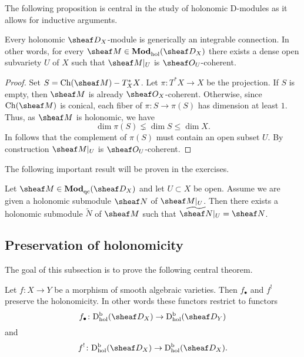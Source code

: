\documentclass[number-in-sections,a4paper]{notes}
\begin{document}
The following proposition is central in the study of holonomic D-modules as it allows for inductive arguments.

\begin{Proposition}\label{prop:generically-integrable-connection}
    Every holonomic $\sD_X$-module is generically an integrable connection.
    In other words, for every $\sheaf M \in \catDModhol{X}$ there exists a dense open subvariety $U$ of $X$ such that $\res{\sheaf M}{U}$ is $\sO_U$-coherent.
\end{Proposition}

\begin{proof}
    Set $S = \Ch(\sheaf M) \setminus T^*_XX$.
    Let $\pi \colon T^*X \to X$ be the projection.
    If $S$ is empty, then $\sheaf M$ is already $\sO_X$-coherent.
    Otherwise, since $\Ch(\sheaf M)$ is conical, each fiber of $\pi\colon S \to \pi(S)$ has dimension at least $1$.
    Thus, as $\sheaf M$ is holonomic, we have
    \[
        \dim \pi(S) \lneq \dim S \le \dim X.
    \]
    In follows that the complement of $\pi(S)$ must contain an open subset $U$.
    By construction $\res{\sheaf M}{U}$ is $\sO_U$-coherent.
\end{proof}

The following important result will be proven in the exercises.

\begin{Proposition}\label{prop:extension-of-holonomic}
    Let $\sheaf M \in \catDModqc{X}$ and let $U \subset X$ be open.
    Assume we are given a holonomic submodule $\sheaf N$ of $\res{\sheaf M}{U}$.
    Then there exists a holonomic submodule $\widetilde N$ of $\sheaf M$ such that $\res{\widetilde{\sheaf N}}{U} = \sheaf N$.
\end{Proposition}

\subsection{Preservation of holonomicity}

The goal of this subsection is to prove the following central theorem.

\begin{Theorem}\label{thm:preservation-of-holonomicity}
    Let $f\colon X \to Y$ be a morphism of smooth algebraic varieties.
    Then $f_\bullet$ and $f^!$ preserve the holonomicity.
    In other words these functors restrict to functors
    \[
        f_\bullet\colon \catDbDModhol{X} \to \catDbDModhol{Y}
    \]
    and
    \[
        f^!\colon \catDbDModhol{X} \to \catDbDModhol{X}.
    \]
\end{Theorem}
\end{document}

